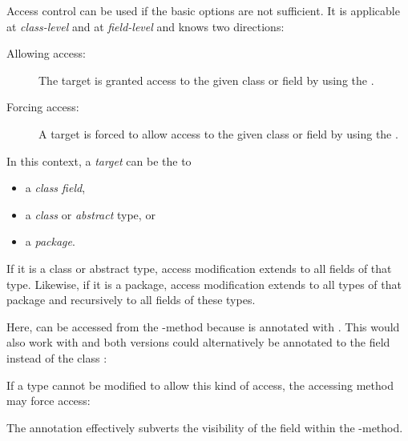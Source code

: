 \documentclass{haxe}
\begin{document}
Access control can be used if the basic  options are not sufficient. It is applicable at \emph{class-level} and at \emph{field-level} and knows two directions:

\begin{description}
	\item[Allowing access:] The target is granted access to the given class or field by using the  .
	\item[Forcing access:] A target is forced to allow access to the given class or field by using the  .
\end{description}

In this context, a \emph{target} can be the  to

\begin{itemize}
	\item a \emph{class field},
	\item a \emph{class} or \emph{abstract} type, or
	\item a \emph{package}.
\end{itemize}

If it is a class or abstract type, access modification extends to all fields of that type. Likewise, if it is a package, access modification extends to all types of that package and recursively to all fields of these types.


Here,  can be accessed from the -method because  is annotated with . This would also work with  and both versions could alternatively be annotated to the field  instead of the class :


If a type cannot be modified to allow this kind of access, the accessing method may force access:


The  annotation effectively subverts the visibility of the  field within the -method. 
\end{document}
